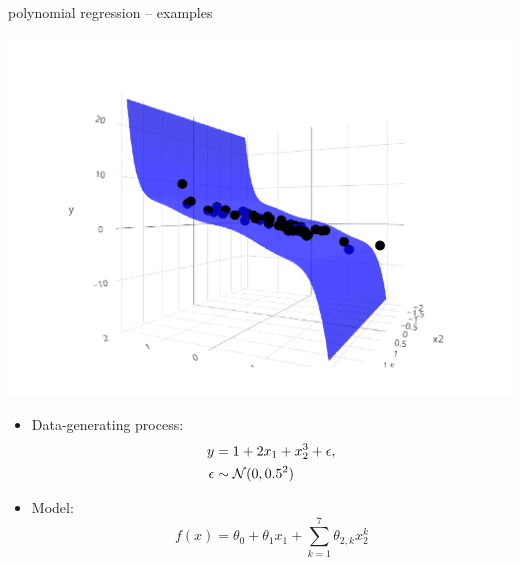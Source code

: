 \documentclass[11pt,compress,t,notes=noshow, xcolor=table]{beamer}
\begin{document}
\begin{frame}{polynomial regression -- examples}
\begin{minipage}[b]{0.5\textwidth}
  \includegraphics[width=\textwidth, trim=80 80 80 80, clip]{
  figure/reg_poly_biv}
\end{minipage}
\begin{minipage}[b]{0.45\textwidth}
  \begin{itemize}
    \footnotesize
    \item
    Data-generating process: 
    \begin{align*}
      y &= 1 + 2 x_1 + x_2^3 + \epsilon, \\
      \epsilon &\sim \mathcal{N}(0, 0.5^2)
    \end{align*}
    \item Model: $$f(x) = \theta_0 + \theta_1 x_1 + 
    \sum_{k = 1}^7 \theta_{2, k} x_2^k$$
  \end{itemize}
\end{minipage}

\end{frame}

\end{document}
